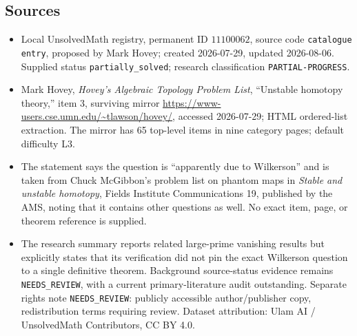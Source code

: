 \documentclass[11pt]{article}
\begin{document}
\subsection{Sources}
\begin{itemize}
\item Local UnsolvedMath registry, permanent ID $11100062$, source code \texttt{catalogue entry}, proposed by Mark Hovey; created 2026-07-29, updated 2026-08-06. Supplied status \texttt{partially\_solved}; research classification \texttt{PARTIAL-PROGRESS}.
\item Mark Hovey, \emph{Hovey's Algebraic Topology Problem List}, ``Unstable homotopy theory,'' item 3, surviving mirror \url{https://www-users.cse.umn.edu/~tlawson/hovey/}, accessed 2026-07-29; HTML ordered-list extraction. The mirror has 65 top-level items in nine category pages; default difficulty L3.
\item The statement says the question is ``apparently due to Wilkerson'' and is taken from Chuck McGibbon's problem list on phantom maps in \emph{Stable and unstable homotopy}, Fields Institute Communications 19, published by the AMS, noting that it contains other questions as well. No exact item, page, or theorem reference is supplied.
\item The research summary reports related large-prime vanishing results but explicitly states that its verification did not pin the exact Wilkerson question to a single definitive theorem. Background source-status evidence remains \texttt{NEEDS\_REVIEW}, with a current primary-literature audit outstanding. Separate rights note \texttt{NEEDS\_REVIEW}: publicly accessible author/publisher copy, redistribution terms requiring review. Dataset attribution: Ulam AI / UnsolvedMath Contributors, CC BY 4.0.
\end{itemize}
\end{document}
